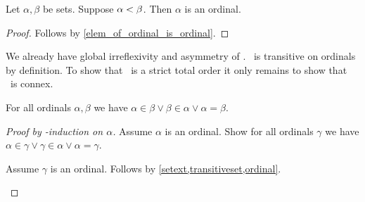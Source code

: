 \begin{lemma}\label{prec_is_ordinal}
    Let $\alpha,\beta$ be sets.
    Suppose $\alpha< \beta$.
    Then $\alpha$ is an ordinal.
\end{lemma}
\begin{proof}
    Follows by \cref{elem_of_ordinal_is_ordinal}.
\end{proof}

We already have global irreflexivity and asymmetry of \in.
\in\ is transitive on ordinals by definition.
To show that \in\ is a strict total order it only remains to show that \in\ is connex.

\begin{proposition}\label{ordinal_elem_connex}
    For all ordinals $\alpha,\beta$
    we have $\alpha\in\beta\lor \beta\in\alpha \lor \alpha = \beta$.
\end{proposition}
\begin{proof}[Proof by \in-induction on $\alpha$]
    Assume $\alpha$ is an ordinal.
    Show for all ordinals $\gamma$ we have $\alpha\in\gamma\lor \gamma\in\alpha \lor \alpha = \gamma$.
    \begin{subproof}
        Assume $\gamma$ is an ordinal.
        Follows by \cref{setext,transitiveset,ordinal}.
    \end{subproof}
\end{proof}

